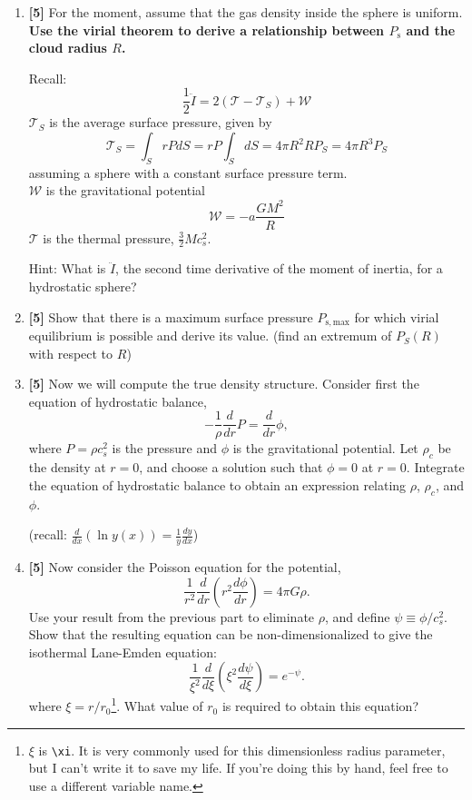 \documentclass{article}
\begin{document}
\begin{enumerate}
\item \textbf{[5]} For the moment, assume that the gas density inside the sphere is uniform.
    \textbf{Use the virial theorem to derive a relationship between $P_{\mathrm{s}}$
    and the cloud radius $R$. }

    Recall:
    $$\frac{1}{2}\ddot{I} = 2 (\mathcal{T} - \mathcal{T}_S) + \mathcal{W}$$
    $\mathcal{T}_S$ is the average surface pressure, given by
    $$\mathcal{T}_S = \int_S r P dS = r P \int_S dS = 4 \pi R^2 R P_S = 4 \pi R^3 P_S$$
    assuming a sphere with a constant surface pressure term. \\
    $\mathcal{W}$ is the gravitational potential
    $$\mathcal{W} = - a \frac{GM^2}{R}$$
    $\mathcal{T}$ is the thermal pressure, $\frac{3}{2} M c_s^2$.

    Hint: What is $\ddot{I}$, the second time derivative of the moment of inertia, for a hydrostatic sphere?

\item \textbf{[5]} Show that there is a maximum surface pressure $P_{\mathrm{s,max}}$ for
    which virial equilibrium is possible and derive its value.
    (find an extremum of $P_S(R)$ with respect to $R$)


\item \textbf{[5]} Now we will compute the true density structure. Consider first the equation of hydrostatic balance,
\begin{displaymath}
-\frac{1}{\rho}\frac{d}{dr} P = \frac{d}{dr} \phi,
\end{displaymath}
where $P = \rho c_s^2$ is the pressure and $\phi$ is the gravitational
potential. Let $\rho_c$ be the density at $r=0$, and choose a solution such that
$\phi = 0$ at $r=0$. Integrate the equation of hydrostatic balance to obtain an
expression relating $\rho$, $\rho_c$, and $\phi$.

(recall: $\frac{d }{dx}\left(\ln y(x)\right) = \frac{1}{y} \frac{d y}{dx}$)


\item \textbf{[5]} Now consider the Poisson equation for the potential,
\begin{displaymath}
\frac{1}{r^2}\frac{d}{dr}\left(r^2 \frac{d\phi}{dr}\right) = 4 \pi G \rho.
\end{displaymath}
Use your result from the previous part to eliminate $\rho$, and define $\psi \equiv \phi/c_s^2$. Show that the resulting equation can be non-dimensionalized to give the isothermal Lane-Emden equation:
\begin{displaymath}
\frac{1}{\xi^2}\frac{d}{d\xi}\left(\xi^2 \frac{d\psi}{d\xi}\right) = e^{-\psi}.
\end{displaymath}
where $\xi = r/r_0$\footnote{$\xi$ is \texttt{\textbackslash xi}.  It is very commonly used
for this dimensionless radius parameter, but I can't write it to save my life.
If you're doing this by hand, feel free to use a different variable name.}.
What value of $r_0$ is required to obtain this equation?
\label{item:r0}


\end{enumerate}
\end{document}
